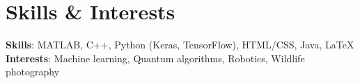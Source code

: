 \documentclass[letterpaper,11pt]{article}
\begin{document}


\section{Skills \& Interests}
 \begin{itemize}[leftmargin=0.15in, label={}]
    \small{\item{
    \vspace{1mm}
     \textbf{Skills}{: MATLAB, C++, Python (Keras, TensorFlow), HTML/CSS, Java, \LaTeX } \\
     \vspace{1mm}
     \textbf{Interests}{: Machine learning, Quantum algorithms, Robotics, Wildlife photography} \\
     \vspace{1mm}
    }}
 \end{itemize}
\end{document}
